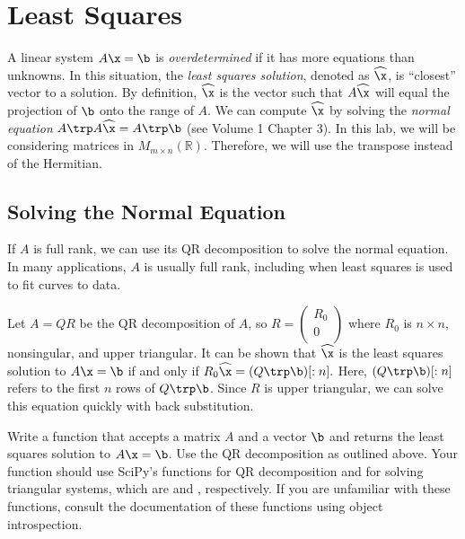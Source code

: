 \label{lab:givens}

\section*{Least Squares} %

A linear system $A\x=\b$ is \emph{overdetermined} if it has more equations than unknowns.
In this situation, the \emph{least squares solution}, denoted as $\widehat{\x}$, is ``closest'' vector to a solution.
By definition, $\widehat{\x}$ is the vector such that $A\widehat{\x}$ will equal the projection of $\b$ onto the range of $A$.
We can compute $\widehat{\x}$ by solving the \emph{normal equation} $A\trp A\widehat{\x} = A\trp \b$ (see Volume 1 Chapter 3).
In this lab, we will be considering matrices in $M_{m \times n}(\mathbb{R})$. Therefore, we will use the transpose instead of the Hermitian.

\subsection*{Solving the Normal Equation} %

If $A$ is full rank, we can use its QR decomposition to solve the normal equation.
In many applications, $A$ is usually full rank, including when least squares is used to fit curves to data.

Let $A=QR$ be the QR decomposition of $A$, so $R = \left(\begin{array}{c}R_0\\
0\\ \end{array} \right)$
where $R_0$ is $n \times n$, nonsingular, and upper triangular.
It can be shown that $\widehat{\x}$ is the least squares solution to $A\x=\b$ if and only if $R_0\widehat{\x} = (Q\trp \b)[:n].$
Here, $(Q\trp \b)[:n]$ refers to the first $n$ rows of $Q\trp \b$.
Since $R$ is upper triangular, we can solve this equation quickly with back substitution.

\begin{problem} %
Write a function that accepts a matrix $A$ and a vector $\b$ and returns the least squares solution to $A\x=\b$.
Use the QR decomposition as outlined above.
Your function should use SciPy's functions for QR decomposition and for solving triangular systems, which are  and , respectively. If you are unfamiliar with these functions, consult the documentation of these functions using object introspection.
\end{problem}

